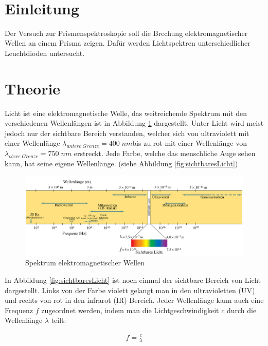 \documentclass[a4paper]{scrartcl}
\def\header#1#2{
	\begin{center}
		{\Large #1}\\
		{#2}
	\end{center}
}
\numberwithin{equation}{subsection}
\begin{document}
\vspace{10pt}
\header{\HEADDING}{\SUBHEADDING}
	
\tableofcontents
	
\newpage
	
\section{Einleitung}
Der Versuch zur Prismenspektroskopie soll die Brechung elektromagnetischer Wellen an einem Prisma zeigen.
Dafür werden Lichtspektren unterschiedlicher Leuchtdioden untersucht.

\newpage
\section{Theorie}
Licht ist eine elektromagnetische Welle, das weitreichende Spektrum mit den verschiedenen Wellenlängen ist in Abbildung \ref{fig:LichtSpektrum} dargestellt.
Unter Licht wird meist jedoch nur der sichtbare Bereich verstanden, welcher sich von ultraviolett mit einer Wellenlänge $\lambda_{untere\;Grenze} = 400\;nm$bis zu rot mit einer Wellenlänge von $\lambda_{obere\;Grenze} = 750\;nm$ erstreckt.
Jede Farbe, welche das menschliche Auge sehen kann, hat seine eigene Wellenlänge. (siehe Abbildung \ref{fig:sichtbaresLicht}) \cite{anl}

\begin{figure}[H]
	\includegraphics[width=12cm]{Abbildungen/Lichtspektrum}
	\centering
	\caption{Spektrum elektromagnetischer Wellen \cite{anl}}
	\centering
	\label{fig:LichtSpektrum}
\end{figure}

In Abbildung \ref{fig:sichtbaresLicht} ist noch einmal der sichtbare Bereich von Licht dargestellt.
Links von der Farbe violett gelangt man in den ultravioletten (UV) und rechts von rot in den infrarot (IR) Bereich. \cite{anl}
Jeder Wellenlänge kann auch eine Frequenz $f$ zugeordnet werden, indem man
die Lichtgeschwindigkeit $c$ durch die Wellenlänge $\lambda$ teilt:

\begin{align}
	f = \frac{c}{\lambda}
\end{align}
\end{document}
